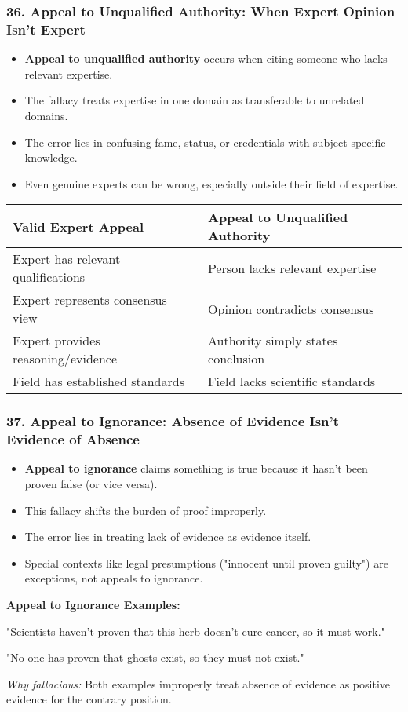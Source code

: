 \documentclass{beamer}
\begin{document}
\begin{frame}
\frametitle{36. Appeal to Unqualified Authority: When Expert Opinion Isn't Expert}
\begin{itemize}
    \item \textbf{Appeal to unqualified authority} occurs when citing someone who lacks relevant expertise.
    \item The fallacy treats expertise in one domain as transferable to unrelated domains.
    \item The error lies in confusing fame, status, or credentials with subject-specific knowledge.
    \item Even genuine experts can be wrong, especially outside their field of expertise.
\end{itemize}

\begin{table}
    \scriptsize
\begin{tabular}{|l|l|}
\hline
\textbf{Valid Expert Appeal} & \textbf{Appeal to Unqualified Authority} \\
\hline
Expert has relevant qualifications & Person lacks relevant expertise \\
\hline
Expert represents consensus view & Opinion contradicts consensus \\
\hline
Expert provides reasoning/evidence & Authority simply states conclusion \\
\hline
Field has established standards & Field lacks scientific standards \\
\hline
\end{tabular}
\end{table}
\end{frame}

\begin{frame}
    \frametitle{37. Appeal to Ignorance: Absence of Evidence Isn't Evidence of Absence}
    \begin{itemize}
        \item \textbf{Appeal to ignorance} claims something is true because it hasn't been proven false (or vice versa).
        \item This fallacy shifts the burden of proof improperly.
        \item The error lies in treating lack of evidence as evidence itself.
        \item Special contexts like legal presumptions ("innocent until proven guilty") are exceptions, not appeals to ignorance.
    \end{itemize}
    
    \begin{example}
    \textbf{Appeal to Ignorance Examples:}
    
    "Scientists haven't proven that this herb doesn't cure cancer, so it must work."
    
    "No one has proven that ghosts exist, so they must not exist."
    
    \textit{Why fallacious:} Both examples improperly treat absence of evidence as positive evidence for the contrary position.
    \end{example}
    \end{frame}
    
\end{document}
